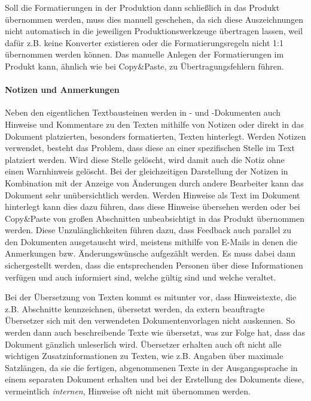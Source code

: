 Soll die Formatierungen in der Produktion dann schließlich in das Produkt übernommen werden, muss dies manuell geschehen, da sich diese Auszeichnungen nicht automatisch in die jeweiligen Produktionswerkzeuge übertragen lassen, weil dafür z.B. keine Konverter existieren oder die Formatierungsregeln nicht 1:1 übernommen werden können. Das manuelle Anlegen der Formatierungen im Produkt kann, ähnlich wie bei Copy\&Paste, zu Übertragungsfehlern führen.

\paragraph{Notizen und Anmerkungen} Neben den eigentlichen Textbausteinen werden in - und -Dokumenten auch Hinweise und Kommentare zu den Texten mithilfe von Notizen oder direkt in das Dokument platzierten, besonders formatierten, Texten hinterlegt. Werden Notizen verwendet, besteht das Problem, dass diese an einer spezifischen Stelle im Text platziert werden. Wird diese Stelle gelöscht, wird damit auch die Notiz ohne einen Warnhinweis gelöscht. Bei der gleichzeitigen Darstellung der Notizen in Kombination mit der Anzeige von Änderungen durch andere Bearbeiter kann das Dokument sehr unübersichtlich werden. Werden Hinweise als Text im Dokument hinterlegt kann dies dazu führen, dass diese Hinweise übersehen werden oder bei Copy\&Paste von großen Abschnitten unbeabsichtigt in das Produkt übernommen  werden. Diese Unzulänglichkeiten führen dazu, dass Feedback auch parallel zu den Dokumenten ausgetauscht wird, meistens mithilfe von E-Mails in denen die Anmerkungen bzw. Änderungswünsche aufgezählt werden. Es muss dabei dann sichergestellt werden, dass die entsprechenden Personen über diese Informationen verfügen und auch informiert sind, welche gültig sind und welche veraltet.

Bei der Übersetzung von Texten kommt es mitunter vor, dass Hinweistexte, die z.B. Abschnitte kennzeichnen, übersetzt werden, da extern beauftragte Übersetzer sich mit den verwendeten Dokumentenvorlagen nicht auskennen. So werden dann auch beschreibende Texte wie  übersetzt, was zur Folge hat, dass das Dokument gänzlich unleserlich wird. Übersetzer erhalten auch oft nicht alle wichtigen Zusatzinformationen zu Texten, wie z.B. Angaben über maximale Satzlängen, da sie die fertigen, abgenommenen Texte in der Ausgangssprache in einem separaten Dokument erhalten und bei der Erstellung des Dokuments diese, vermeintlich \emph{internen}, Hinweise oft nicht mit übernommen werden.

